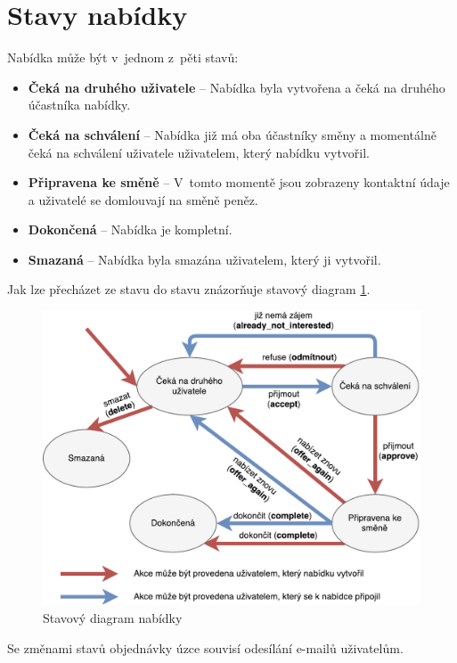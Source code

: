 \section{Stavy nabídky}
\label{nur:status}

Nabídka může být v~jednom z~pěti stavů:
\begin{itemize}
    \item \textbf{Čeká na druhého uživatele} -- Nabídka byla vytvořena a čeká na druhého účastníka nabídky.
    \item \textbf{Čeká na schválení} -- Nabídka již má oba účastníky směny a momentálně čeká na schválení uživatele uživatelem, který nabídku vytvořil.
    \item \textbf{Připravena ke směně} -- V~tomto momentě jsou zobrazeny kontaktní údaje a uživatelé se domlouvají na směně peněz.
    \item \textbf{Dokončená} -- Nabídka je kompletní.
    \item \textbf{Smazaná} -- Nabídka byla smazána uživatelem, který ji vytvořil.
\end{itemize}
Jak lze přecházet ze stavu do stavu znázorňuje stavový diagram \ref{fig:implementation:state-diagram}.
\begin{figure}[h]
    \centering
    \includegraphics[width=1.0\textwidth]{media/state-diagram-cs}
    \caption{Stavový diagram nabídky}
    \label{fig:implementation:state-diagram}
\end{figure}

Se změnami stavů objednávky úzce souvisí odesílání e-mailů uživatelům.